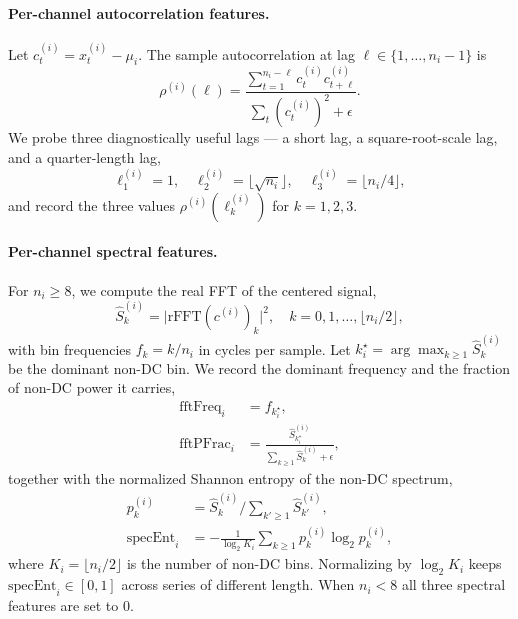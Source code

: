 \paragraph{Per-channel autocorrelation features.}
Let $c^{(i)}_t = x^{(i)}_t - \mu_i$. The sample autocorrelation at lag
$\ell \in \{1, \ldots, n_i-1\}$ is
\begin{equation}
    \rho^{(i)}(\ell)
    = \frac{\sum_{t=1}^{n_i-\ell} c^{(i)}_t c^{(i)}_{t+\ell}}
           {\sum_t (c^{(i)}_t)^2 + \epsilon}.
\end{equation}
We probe three diagnostically useful lags --- a short lag, a
square-root-scale lag, and a quarter-length lag,
\begin{equation}
    \ell^{(i)}_1 = 1, \quad
    \ell^{(i)}_2 = \lfloor \sqrt{n_i} \rfloor, \quad
    \ell^{(i)}_3 = \lfloor n_i/4 \rfloor,
\end{equation}
and record the three values $\rho^{(i)}(\ell^{(i)}_k)$ for $k=1,2,3$.

\paragraph{Per-channel spectral features.}
For $n_i \ge 8$, we compute the real FFT of the centered signal,
\begin{equation}
    \widehat{S}^{(i)}_k = \big| \mathrm{rFFT}(c^{(i)})_k \big|^2,
    \quad k = 0, 1, \ldots, \lfloor n_i/2 \rfloor,
\end{equation}
with bin frequencies $f_k = k/n_i$ in cycles per sample. Let
$k^\star_i = \arg\max_{k \ge 1} \widehat{S}^{(i)}_k$ be the dominant
non-DC bin. We record the dominant frequency and the fraction of
non-DC power it carries,
\begin{align}
\mathrm{fftFreq}_i  &= f_{k^\star_i}, \\
\mathrm{fftPFrac}_i &= \frac{\widehat{S}^{(i)}_{k^\star_i}}
                            {\sum_{k \ge 1} \widehat{S}^{(i)}_k + \epsilon},
\end{align}
together with the normalized Shannon entropy of the non-DC spectrum,
\begin{align}
p^{(i)}_k          &= \widehat{S}^{(i)}_k \Big/
                       \textstyle\sum_{k' \ge 1} \widehat{S}^{(i)}_{k'}, \\
\mathrm{specEnt}_i &= -\frac{1}{\log_2 K_i}
                       \textstyle\sum_{k \ge 1}
                       p^{(i)}_k \log_2 p^{(i)}_k,
\end{align}
where $K_i = \lfloor n_i/2 \rfloor$ is the number of non-DC bins.
Normalizing by $\log_2 K_i$ keeps $\mathrm{specEnt}_i \in [0,1]$
across series of different length. When $n_i < 8$ all three spectral
features are set to $0$.

